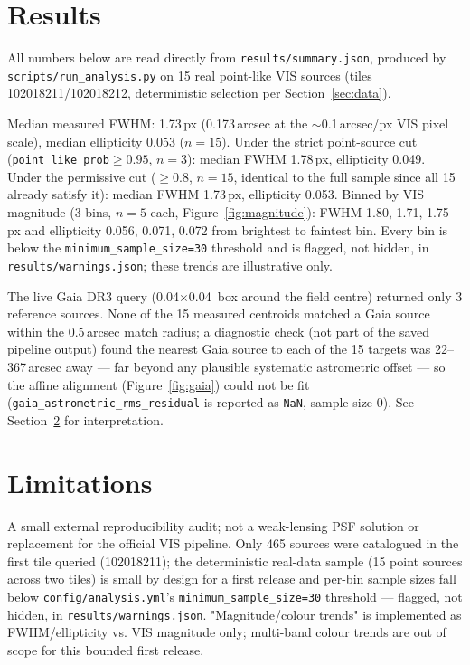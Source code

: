 \documentclass[11pt]{article}
\begin{document}
\section{Results}
\label{sec:results}
All numbers below are read directly from \texttt{results/summary.json},
produced by \texttt{scripts/run\_analysis.py} on 15 real point-like VIS
sources (tiles 102018211/102018212, deterministic selection per
Section~\ref{sec:data}).

Median measured FWHM: 1.73\,px (0.173\,arcsec at the $\sim$0.1\,arcsec/px
VIS pixel scale), median ellipticity 0.053 ($n=15$). Under the strict
point-source cut (\texttt{point\_like\_prob}$\geq 0.95$, $n=3$): median FWHM
1.78\,px, ellipticity 0.049. Under the permissive cut ($\geq 0.8$, $n=15$,
identical to the full sample since all 15 already satisfy it): median FWHM
1.73\,px, ellipticity 0.053. Binned by VIS magnitude (3 bins, $n=5$ each,
Figure~\ref{fig:magnitude}): FWHM 1.80, 1.71, 1.75\,px and ellipticity 0.056,
0.071, 0.072 from brightest to faintest bin. Every bin is below the
\texttt{minimum\_sample\_size=30} threshold and is flagged, not hidden, in
\texttt{results/warnings.json}; these trends are illustrative only.

The live Gaia DR3 query (0.04\textdegree$\times$0.04\textdegree\ box around
the field centre) returned only 3 reference sources. None of the 15 measured
centroids matched a Gaia source within the 0.5\,arcsec match radius; a
diagnostic check (not part of the saved pipeline output) found the nearest
Gaia source to each of the 15 targets was 22--367\,arcsec away --- far
beyond any plausible systematic astrometric offset --- so the affine
alignment (Figure~\ref{fig:gaia}) could not be fit
(\texttt{gaia\_astrometric\_rms\_residual} is reported as \texttt{NaN},
sample size 0). See Section~\ref{sec:limitations} for interpretation.

\section{Limitations}
\label{sec:limitations}
A small external reproducibility audit; not a weak-lensing PSF solution or
replacement for the official VIS pipeline. Only 465 sources were catalogued
in the first tile queried (102018211); the deterministic real-data sample
(15 point sources across two tiles) is small by design for a first release
and per-bin sample sizes fall below \texttt{config/analysis.yml}'s
\texttt{minimum\_sample\_size=30} threshold --- flagged, not hidden, in
\texttt{results/warnings.json}. "Magnitude/colour trends" is implemented as
FWHM/ellipticity vs. VIS magnitude only; multi-band colour trends are out of
scope for this bounded first release.
\end{document}

